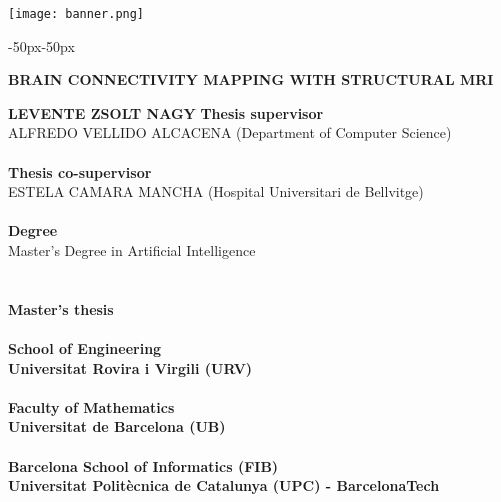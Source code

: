\begin{titlepage}
    \begin{center}
        \begingroup
          \let\clearpage\relax

          \texttt{[image: banner.png]}
          \vfill
          \LARGE
          \begin{adjustwidth}{-50px}{-50px}\begin{center}
          \textbf{\MakeUppercase{Brain Connectivity Mapping with Structural MRI}}
          \end{center}\end{adjustwidth}
          \vfill
          \large
          \textbf{\MakeUppercase{Levente Zsolt Nagy}}
          \vfill
          \normalsize
          \textbf{Thesis supervisor}\\
          \MakeUppercase{Alfredo Vellido Alcacena} (Department of Computer Science)\\
          \hfill\\
          \textbf{Thesis co-supervisor}\\
          \MakeUppercase{Estela Camara Mancha} (Hospital Universitari de Bellvitge)\\
          \hfill\\
          \textbf{Degree}\\
          Master's Degree in Artificial Intelligence\\
          \hfill\\\hfill\\
          \textbf{Master's thesis}\\
          \hfill\\
          \textbf{School of Engineering}\\
          \textbf{Universitat Rovira i Virgili (URV)}\\
          \hfill\\
          \textbf{Faculty of Mathematics}\\
          \textbf{Universitat de Barcelona (UB)}\\
          \hfill\\
          \textbf{Barcelona School of Informatics (FIB)}\\
          \textbf{Universitat Politècnica de Catalunya (UPC) - BarcelonaTech}\\


\end{center}
\end{titlepage}
